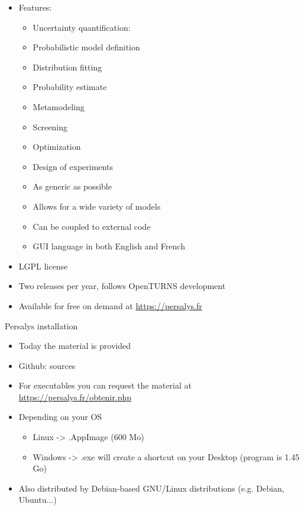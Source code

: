 \documentclass{beamer}
\begin{document}
  \begin{frame}{}
  \protect\hypertarget{section}{}
  \begin{itemize}
  
  \item
    Features:
  
    \begin{itemize}
    
    \item
      Uncertainty quantification:
    \item
      Probabilistic model definition
    \item
      Distribution fitting
    \item
      Probability estimate
    \item
      Metamodeling
    \item
      Screening
    \item
      Optimization
    \item
      Design of experiments
    \item
      As generic as possible
  
      
      \item
        Allows for a wide variety of models
      \item
        Can be coupled to external code
    \item
      GUI language in both English and French
    \end{itemize}
  \item
    LGPL license
  \item
    Two releases per year, follows OpenTURNS development
  \item
    Available for free on demand at
    \url{https://persalys.fr}
  
  \end{itemize}
  \end{frame}
  
  \begin{frame}{Persalys installation}
  \protect\hypertarget{persalys-installation}{}
  \begin{itemize}
  
  \item
    Today the material is provided
  \item
    Github: sources
  \item
    For executables you can request the material at
    \url{https://persalys.fr/obtenir.php}
  \item
    Depending on your OS
  
    \begin{itemize}
    
    \item
      Linux -\textgreater{} .AppImage (600 Mo)
    \item
      Windows -\textgreater{} .exe will create a shortcut on your Desktop
      (program is 1.45 Go)
    \end{itemize}
    \item Also distributed by Debian-based GNU/Linux distributions (e.g. Debian, Ubuntu...)
  \end{itemize}
  \end{frame}
\end{document}
